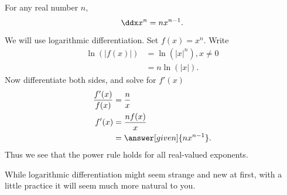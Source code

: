 \documentclass{ximera}
\begin{document}
\begin{theorem}
For any real number $n$, 
\[
\ddx x^n = n x^{n-1}.
\]
\begin{explanation}
We will use logarithmic differentiation. Set $f(x) = x^n$. Write
\begin{align*}
\ln(|f(x)|) &= \ln\left(|x|^n\right) , x\ne0\\ 
&= n\ln(|x|).
\end{align*}
Now differentiate both sides, and solve for $f'(x)$
\begin{align*}
\frac{f'(x)}{f(x)} &= \frac{n}{x}\\
f'(x) &=\frac{n f(x)}{x}\\
&= \answer[given]{n x^{n-1}}.
\end{align*}
Thus we see that the power rule holds for all real-valued exponents.
\end{explanation}
\end{theorem}

While logarithmic differentiation might seem strange and new at
first, with a little practice it will seem much more natural to you.
\end{document}
